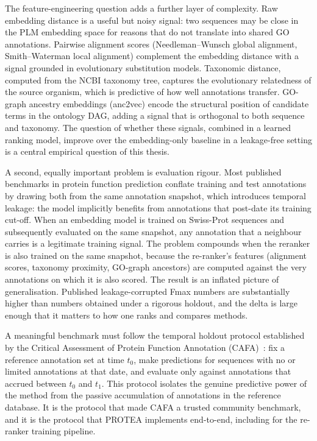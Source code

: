 The feature-engineering question adds a further layer of complexity. Raw embedding
distance is a useful but noisy signal: two sequences may be close in the PLM embedding
space for reasons that do not translate into shared GO annotations. Pairwise alignment
scores (Needleman--Wunsch global alignment, Smith--Waterman local alignment)
complement the embedding distance with a signal grounded in evolutionary substitution
models. Taxonomic distance, computed from the NCBI taxonomy tree, captures the
evolutionary relatedness of the source organism, which is predictive of how well
annotations transfer. GO-graph ancestry embeddings (anc2vec) encode the structural
position of candidate terms in the ontology DAG, adding a signal that is orthogonal
to both sequence and taxonomy. The question of whether these signals, combined in a
learned ranking model, improve over the embedding-only baseline in a leakage-free
setting is a central empirical question of this thesis.

A second, equally important problem is evaluation rigour. Most published benchmarks
in protein function prediction conflate training and test annotations by drawing both
from the same annotation snapshot, which introduces temporal leakage: the model
implicitly benefits from annotations that post-date its training cut-off. When an
embedding model is trained on Swiss-Prot sequences and subsequently evaluated on the
same snapshot, any annotation that a neighbour carries is a legitimate training
signal. The problem compounds when the reranker is also trained on the same snapshot,
because the re-ranker's features (alignment scores, taxonomy proximity, GO-graph
ancestors) are computed against the very annotations on which it is also scored.
The result is an inflated picture of generalisation. Published leakage-corrupted
Fmax numbers are substantially higher than numbers obtained under a rigorous holdout,
and the delta is large enough that it matters to how one ranks and compares methods.

A meaningful benchmark must follow the temporal holdout protocol established by the
Critical Assessment of Protein Function Annotation (CAFA)~\cite{cafa5_2023}: fix a
reference annotation set at time $t_0$, make predictions for sequences with no or
limited annotations at that date, and evaluate only against annotations that accrued
between $t_0$ and $t_1$. This protocol isolates the genuine predictive power of the
method from the passive accumulation of annotations in the reference database. It is
the protocol that made CAFA a trusted community benchmark, and it is the protocol
that PROTEA implements end-to-end, including for the re-ranker training pipeline.

